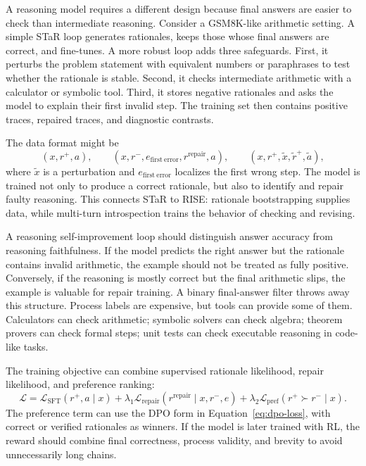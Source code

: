 A reasoning model requires a different design because final answers are easier to check than intermediate reasoning. Consider a GSM8K-like arithmetic setting. A simple STaR loop generates rationales, keeps those whose final answers are correct, and fine-tunes. A more robust loop adds three safeguards. First, it perturbs the problem statement with equivalent numbers or paraphrases to test whether the rationale is stable. Second, it checks intermediate arithmetic with a calculator or symbolic tool. Third, it stores negative rationales and asks the model to explain their first invalid step. The training set then contains positive traces, repaired traces, and diagnostic contrasts.

The data format might be
\begin{equation}
    (x, r^{+}, a),\qquad (x,r^{-},e_{\mathrm{first\ error}},r^{\mathrm{repair}},a),\qquad (x, r^{+}, \tilde{x},\tilde{r}^{+},\tilde{a}),
\end{equation}
where $\tilde{x}$ is a perturbation and $e_{\mathrm{first\ error}}$ localizes the first wrong step. The model is trained not only to produce a correct rationale, but also to identify and repair faulty reasoning. This connects STaR to RISE: rationale bootstrapping supplies data, while multi-turn introspection trains the behavior of checking and revising.

A reasoning self-improvement loop should distinguish answer accuracy from reasoning faithfulness. If the model predicts the right answer but the rationale contains invalid arithmetic, the example should not be treated as fully positive. Conversely, if the reasoning is mostly correct but the final arithmetic slips, the example is valuable for repair training. A binary final-answer filter throws away this structure. Process labels are expensive, but tools can provide some of them. Calculators can check arithmetic; symbolic solvers can check algebra; theorem provers can check formal steps; unit tests can check executable reasoning in code-like tasks.

The training objective can combine supervised rationale likelihood, repair likelihood, and preference ranking:
\begin{equation}
    \mathcal{L}=\mathcal{L}_{\mathrm{SFT}}(r^{+},a\mid x)+
    \lambda_1\mathcal{L}_{\mathrm{repair}}(r^{\mathrm{repair}}\mid x,r^{-},e)+
    \lambda_2\mathcal{L}_{\mathrm{pref}}(r^{+}\succ r^{-}\mid x).
\end{equation}
The preference term can use the DPO form in Equation~\ref{eq:dpo-loss}, with correct or verified rationales as winners. If the model is later trained with RL, the reward should combine final correctness, process validity, and brevity to avoid unnecessarily long chains.

